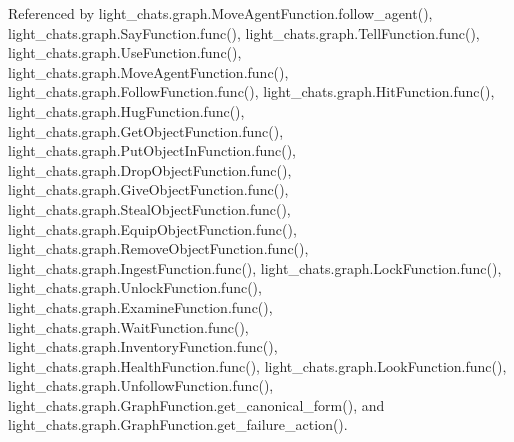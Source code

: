 Referenced by light\+\_\+chats.\+graph.\+Move\+Agent\+Function.\+follow\+\_\+agent(), light\+\_\+chats.\+graph.\+Say\+Function.\+func(), light\+\_\+chats.\+graph.\+Tell\+Function.\+func(), light\+\_\+chats.\+graph.\+Use\+Function.\+func(), light\+\_\+chats.\+graph.\+Move\+Agent\+Function.\+func(), light\+\_\+chats.\+graph.\+Follow\+Function.\+func(), light\+\_\+chats.\+graph.\+Hit\+Function.\+func(), light\+\_\+chats.\+graph.\+Hug\+Function.\+func(), light\+\_\+chats.\+graph.\+Get\+Object\+Function.\+func(), light\+\_\+chats.\+graph.\+Put\+Object\+In\+Function.\+func(), light\+\_\+chats.\+graph.\+Drop\+Object\+Function.\+func(), light\+\_\+chats.\+graph.\+Give\+Object\+Function.\+func(), light\+\_\+chats.\+graph.\+Steal\+Object\+Function.\+func(), light\+\_\+chats.\+graph.\+Equip\+Object\+Function.\+func(), light\+\_\+chats.\+graph.\+Remove\+Object\+Function.\+func(), light\+\_\+chats.\+graph.\+Ingest\+Function.\+func(), light\+\_\+chats.\+graph.\+Lock\+Function.\+func(), light\+\_\+chats.\+graph.\+Unlock\+Function.\+func(), light\+\_\+chats.\+graph.\+Examine\+Function.\+func(), light\+\_\+chats.\+graph.\+Wait\+Function.\+func(), light\+\_\+chats.\+graph.\+Inventory\+Function.\+func(), light\+\_\+chats.\+graph.\+Health\+Function.\+func(), light\+\_\+chats.\+graph.\+Look\+Function.\+func(), light\+\_\+chats.\+graph.\+Unfollow\+Function.\+func(), light\+\_\+chats.\+graph.\+Graph\+Function.\+get\+\_\+canonical\+\_\+form(), and light\+\_\+chats.\+graph.\+Graph\+Function.\+get\+\_\+failure\+\_\+action().

